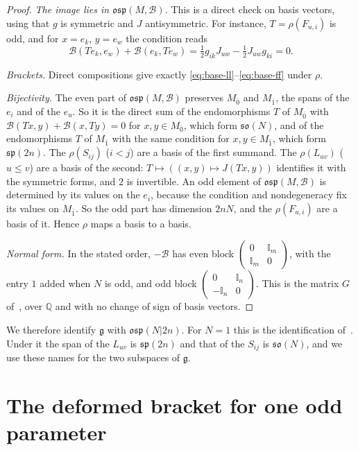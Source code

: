 \documentclass[11pt]{article}
\numberwithin{equation}{section}
\theoremstyle{definition}
\theoremstyle{remark}
\newcommand{\osp}{\mathfrak{osp}}
\begin{document}
\begin{proof}
\emph{The image lies in $\osp(M,\mathcal B)$.} This is a direct check on basis vectors, using that $g$
is symmetric and $J$ antisymmetric. For instance, $T=\rho(F_{u,i})$ is odd, and for
$x=e_k$, $y=e_w$ the condition reads
\[
 \mathcal B(Te_k,e_w)+\mathcal B(e_k,Te_w)=\tfrac12g_{ik}J_{uw}-\tfrac12J_{uw}g_{ki}=0 .
\]

\emph{Brackets.} Direct compositions give exactly \eqref{eq:base-ll}--\eqref{eq:base-ff}
under $\rho$.

\emph{Bijectivity.} The even part of $\osp(M,\mathcal B)$ preserves $M_{\bar0}$ and
$M_{\bar1}$, the spans of the $e_i$ and of the $e_u$. So it is the direct sum of the
endomorphisms $T$ of $M_{\bar0}$ with $\mathcal B(Tx,y)+\mathcal B(x,Ty)=0$ for $x,y\in M_{\bar0}$,
which form $\mathfrak{so}(N)$, and of the endomorphisms $T$ of $M_{\bar1}$ with the same condition
for $x,y\in M_{\bar1}$, which form $\mathfrak{sp}(2n)$. The $\rho(S_{ij})$ ($i<j$)
are a basis of the first summand. The $\rho(L_{uv})$ ($u\leq v$) are a basis of the
second: $T\mapsto((x,y)\mapsto J(Tx,y))$ identifies it with the symmetric forms, and $2$
is invertible. An odd element of $\osp(M,\mathcal B)$ is determined by its values on the
$e_i$, because the condition and nondegeneracy fix its values on $M_{\bar1}$. So the odd
part has dimension $2nN$, and the $\rho(F_{u,i})$ are a basis of it. Hence $\rho$ maps a
basis to a basis.

\emph{Normal form.} In the stated order, $-\mathcal B$ has even block
$\begin{pmatrix}0&\mathbb I_m\\ \mathbb I_m&0\end{pmatrix}$, with the entry $1$ added
when $N$ is odd, and odd block $\begin{pmatrix}0&\mathbb I_n\\-\mathbb I_n&0\end{pmatrix}$.
This is the matrix $G$ of~\cite[\S2.27]{FSS00}, over $\mathbb Q$ and with no change of sign of
basis vectors.
\end{proof}

We therefore identify $\mathfrak g$ with $\osp(N|2n)$. For $N=1$ this is the
identification of~\cite[Section~2]{Aoi26}. Under it the span of the $L_{uv}$ is $\mathfrak{sp}(2n)$ and that
of the $S_{ij}$ is $\mathfrak{so}(N)$, and we use these names for the two subspaces of $\mathfrak g$.

\section{The deformed bracket for one odd parameter}\label{sec:single}
\end{document}
